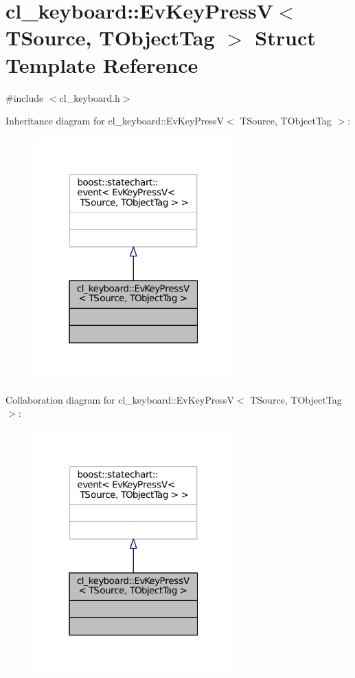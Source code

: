 \hypertarget{structcl__keyboard_1_1EvKeyPressV}{}\section{cl\+\_\+keyboard\+:\+:Ev\+Key\+PressV$<$ T\+Source, T\+Object\+Tag $>$ Struct Template Reference}
\label{structcl__keyboard_1_1EvKeyPressV}


{\ttfamily \#include $<$cl\+\_\+keyboard.\+h$>$}



Inheritance diagram for cl\+\_\+keyboard\+:\+:Ev\+Key\+PressV$<$ T\+Source, T\+Object\+Tag $>$\+:
\nopagebreak
\begin{figure}[H]
\begin{center}
\leavevmode
\includegraphics[width=220pt]{structcl__keyboard_1_1EvKeyPressV__inherit__graph}
\end{center}
\end{figure}


Collaboration diagram for cl\+\_\+keyboard\+:\+:Ev\+Key\+PressV$<$ T\+Source, T\+Object\+Tag $>$\+:
\nopagebreak
\begin{figure}[H]
\begin{center}
\leavevmode
\includegraphics[width=220pt]{structcl__keyboard_1_1EvKeyPressV__coll__graph}
\end{center}
\end{figure}


